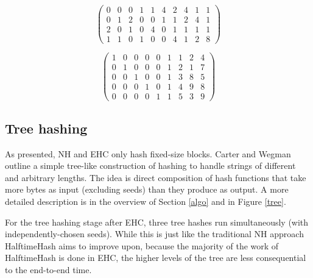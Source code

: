 \documentclass[sigconf, nonacm]{acmart}
\begin{document}
\[
\left(
\begin{array}{rrrrrrrrrr}
 0 & 0 & 0 & 1 & 1 & 4 & 2 & 4 & 1 & 1 \\
 0 & 1 & 2 & 0 & 0 & 1 & 1 & 2 & 4 & 1 \\
 2 & 0 & 1 & 0 & 4 & 0 & 1 & 1 & 1 & 1 \\
 1 & 1 & 0 & 1 & 0 & 0 & 4 & 1 & 2 & 8
\end{array}
\right)
\]

\[
\left(
\begin{array}{rrrrrrrrr}
 1 & 0 & 0 & 0 & 0 & 1 & 1 & 2 & 4\\
 0 & 1 & 0 & 0 & 0 & 1 & 2 & 1 & 7\\
 0 & 0 & 1 & 0 & 0 & 1 & 3 & 8 & 5\\
 0 & 0 & 0 & 1 & 0 & 1 & 4 & 9 & 8\\
 0 & 0 & 0 & 0 & 1 & 1 & 5 & 3 & 9
\end{array}
\right)
\]


\subsection{Tree hashing}

As presented, NH and EHC only hash fixed-size blocks.
Carter and Wegman outline a simple tree-like construction of hashing to handle strings of different and arbitrary lengths. \cite{badger,carter-wegman-79}
The idea is direct composition of hash functions that take more bytes as input (excluding seeds) than they produce as output.
A more detailed description is in the overview of Section \ref{algo} and in Figure \ref{tree}.

For the tree hashing stage after EHC, three tree hashes run simultaneously (with independently-chosen seeds).
While this is just like the traditional NH approach HalftimeHash aims to improve upon, because the majority of the work of HalftimeHash is done in EHC, the higher levels of the tree are less consequential to the end-to-end time.


\end{document}
